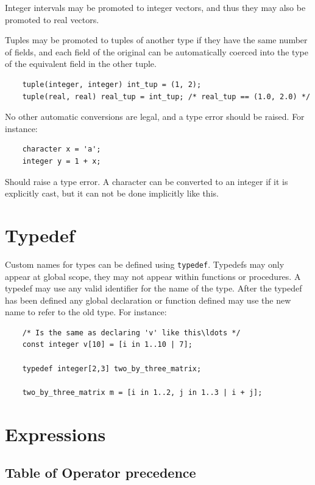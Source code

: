 \documentclass{article}
\begin{document}
  Integer intervals may be promoted to integer vectors, and thus they may also be promoted to real vectors.

  Tuples may be promoted to tuples of another type if they have the same number of fields, and each field of the
  original can be automatically coerced into the type of the equivalent field in the other tuple.

  \begin{lstlisting}
    tuple(integer, integer) int_tup = (1, 2);
    tuple(real, real) real_tup = int_tup; /* real_tup == (1.0, 2.0) */
  \end{lstlisting}

  No other automatic conversions are legal, and a type error should be raised.  For instance:

  \begin{lstlisting}
    character x = 'a';
    integer y = 1 + x;
  \end{lstlisting}

  Should raise a type error. A character can be converted to an integer if it is explicitly cast, but it can not be
  done implicitly like this.


\section{Typedef}\label{sec:typedef}

  Custom names for types can be defined using \texttt{typedef}. Typedefs may only appear at global scope, they may not
  appear within functions or procedures. A typedef may use any valid identifier for the name of the type. After the
  typedef has been defined any global declaration or function defined may use the new name to refer to the old type.
  For instance:

  \begin{lstlisting}
    /* Is the same as declaring 'v' like this\ldots */
    const integer v[10] = [i in 1..10 | 7];

    typedef integer[2,3] two_by_three_matrix;

    two_by_three_matrix m = [i in 1..2, j in 1..3 | i + j];
  \end{lstlisting}


\section{Expressions}\label{sec:expressions}

  \subsection{Table of Operator precedence}\label{sec:operators}
\end{document}
